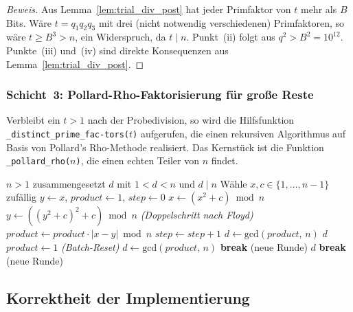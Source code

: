 ﻿\documentclass[12pt, a4paper]{article}
\theoremstyle{plain}
\theoremstyle{definition}
\theoremstyle{remark}
\newenvironment{myproof}[1][Beweis]{%
  \begin{proof}[#1]
}{%
  \end{proof}
}
\newcommand{\GCD}{\mathrm{gcd}}
\begin{document}
\begin{myproof}
  Aus Lemma~\ref{lem:trial_div_post} hat jeder Primfaktor von $t$ mehr
  als $B$ Bits. W\"are $t = q_1 q_2 q_3$ mit drei (nicht notwendig
  verschiedenen) Primfaktoren, so w\"are $t \ge B^3 > n$, ein
  Widerspruch, da $t \mid n$.
  Punkt~(ii) folgt aus $q^2 > B^2 = 10^{12}$. Punkte~(iii) und~(iv)
  sind direkte Konsequenzen aus Lemma~\ref{lem:trial_div_post}.
\end{myproof}

\subsubsection{Schicht~3: Pollard-Rho-Faktorisierung f\"ur gro{\ss}e Reste}

Verbleibt ein $t > 1$ nach der Probedivision, so wird die Hilfsfunktion
\texttt{\_distinct\_prime\_fac-\newline tors($t$)} aufgerufen, die einen
rekursiven Algorithmus auf Basis von Pollard's Rho-Methode realisiert. Das Kernst\"uck ist die Funktion \texttt{\_pollard\_rho($n$)},
die einen echten Teiler von $n$ findet.

\begin{algorithm}[H]
\caption{Pollard-Rho mit Batch-GCD (Floyd-Zyklus)}
\label{alg:pollard_rho}
\begin{algorithmic}[1]
\Require $n > 1$ zusammengesetzt
\Ensure $d$ mit $1 < d < n$ und $d \mid n$
\State W\"ahle $x, c \in \{1,\ldots,n-1\}$ zuf\"allig
\State $y \leftarrow x$,\; $\mathit{product} \leftarrow 1$,\; $\mathit{step} \leftarrow 0$
\Loop
  \State $x \leftarrow (x^2 + c) \bmod n$
  \State $y \leftarrow ((y^2+c)^2+c) \bmod n$ \quad\textit{(Doppelschritt nach Floyd)}
  \State $\mathit{product} \leftarrow \mathit{product} \cdot |x - y| \bmod n$
  \State $\mathit{step} \leftarrow \mathit{step} + 1$
    \State $d \leftarrow \GCD(\mathit{product},\, n)$
     \Return $d$ \EndIf
    \State $\mathit{product} \leftarrow 1$ \quad\textit{(Batch-Reset)}
  \EndIf
  \State $d \leftarrow \GCD(\mathit{product},\, n)$
   \textbf{break} \;(neue Runde) \EndIf
   \Return $d$ \EndIf
   \textbf{break} \;(neue Runde) \EndIf
\EndLoop
\end{algorithmic}
\end{algorithm}

\subsection{Korrektheit der Implementierung}
\label{subsec:phi_korrektheit}
\end{document}

